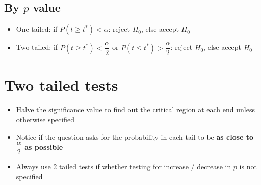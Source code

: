 \subsection{By $p$ value}
\begin{itemize}
    \item One tailed: if $P(t\geq t^*) < \alpha$: reject $H_0$, else accept $H_0$
    \item Two tailed: if $P(t\geq t^*) < \dfrac{\alpha}{2}$ or $P(t\leq t^*) > \dfrac{\alpha}{2}$: reject $H_0$, else accept $H_0$
\end{itemize}

\begin{comment}
\subsection{Presenting the solution}
\begin{enumerate}
    \item Define the test statistic, $X$ and the parameter, $p$
    \item Formulate a model for $X$ ($X \sim B(n, p)$)
    \item Write down $H_0$ and $H_1$ as statements involving $p$ (these determine whether your test is one or two-tailed)
    \item Specify the significance level
    \item Decide whether to reject $H_0$ by comparing $t^*$ to critical value or finding the probability of $t^*$ taking $x$ or a more extreme value
    \item State your conclusion: there is / is not sufficient evidence to reject $H_0$ + a statement \textbf{in the context of the question}
\end{enumerate}

\end{comment}


\section{Two tailed tests}
\begin{itemize}
    \item Halve the significance value to find out the critical region at each end unless otherwise specified
    \item Notice if the question asks for the probability in each tail to be \textbf{as close to $\dfrac{\alpha}{2}$ as possible}
    \item Always use 2 tailed tests if whether testing for increase / decrease in $p$ is not specified
\end{itemize}

